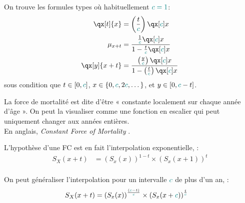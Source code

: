 \documentclass[10pt, french]{article}
\begin{document}
\begin{multicols*}{3}
On trouve les formules types où habituellement $\textcolor{teal}{c = 1}$:
\begin{align*}
	\qx[t]{x} 
	&=	\left(\frac{t}{\textcolor{teal}{c}}\right) \qx[\textcolor{teal}{c}]{x}	\\
	\mu_{x + t} 
	&=	\frac{\frac{1}{\textcolor{teal}{c}} \qx[\textcolor{teal}{c}]{x}}{1 - \frac{t}{\textcolor{teal}{c}} \qx[\textcolor{teal}{c}]{x}}	\\
	\qx[y]{x + t} 
	&=	\frac{\left(\frac{y}{\textcolor{teal}{c}}\right) \qx[\textcolor{teal}{c}]{x}}{1 -\left(\frac{t}{\textcolor{teal}{c}}\right) \qx[\textcolor{teal}{c}]{x}}
\end{align*}
sous condition que $t \in [0, \textcolor{teal}{c}]$, $x \in \{0, \textcolor{teal}{c}, 2\textcolor{teal}{c}, \dots\}$, et $y \in [0, \textcolor{teal}{c} - t]$.




\begin{definitionNOHFILL}
\begin{rappel_enhanced}[Contexte]
La force de mortalité est dite d'être « constante localement sur chaque année d'âge ». On peut la visualiser comme une fonction en escalier qui peut uniquement changer aux années entières. \\

En anglais, \og \textit{Constant Force of Mortality} \fg{}.
\end{rappel_enhanced}

\bigskip

L'hypothèse d'une FC est en fait l'interpolation exponentielle, :
\begin{align*}
	S_{X}(x + t) 
	&=	\left(S_{x}(x)\right)^{1 - t} \times \left(S_{x}(x + 1)\right)^{t}	\\
\end{align*}

On peut généraliser l'interpolation pour un intervalle $\textcolor{teal}{c}$ de plus d'un an,  :
\begin{align*}
	S_{X}(x + t) 
	&=	\left(S_{x}(x)\right)^{\frac{(\textcolor{teal}{c} - t)}{\textcolor{teal}{c}}} \times \left(S_{x}(x + \textcolor{teal}{c})\right)^{\frac{t}{\textcolor{teal}{c}}}	
\end{align*}
\end{definitionNOHFILL}


\end{multicols*}
\end{document}
